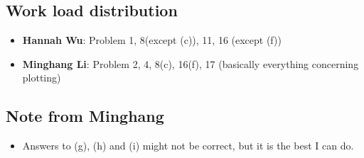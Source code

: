 \documentclass[
    classnum=MATH564,
    classname=MATHEMATICAL\ MODELING,
    due=February\ 7\,\ 2020,
    author=Hannah\ Wu\qquad\ Minghang\ Li,
    authorshort=Wu\ \&\ Li,
    teacher= Zachary\ M.\ Boyd,
    hw=2
]{../hw-template}
\begin{document}

\pagebreak


\pagebreak


\pagebreak


\pagebreak


\pagebreak


\pagebreak



\begin{tcolorbox}
\subsection{Work load distribution}
\begin{itemize}
    \item[] \textbf{Hannah Wu}: Problem 1, 8(except (c)), 11, 16 (except (f))
    \item[] \textbf{Minghang Li}: Problem 2, 4, 8(c), 16(f), 17 {\color{gray}
    (basically everything concerning plotting)}
\end{itemize}

\subsection{Note from Minghang}
\begin{itemize}
    \item[] Answers to (g), (h) and (i) might not be correct, but it is the 
best I can do.
\end{itemize}
\end{tcolorbox}
\end{document}

